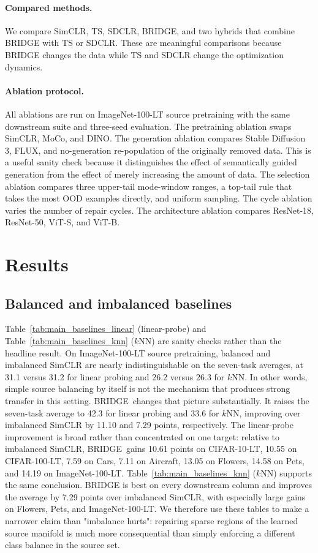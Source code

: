 \documentclass{article}
\newcommand{\method}{BRIDGE}
\begin{document}
\paragraph{Compared methods.}
We compare SimCLR, TS, SDCLR, \method, and two hybrids that combine BRIDGE with TS or SDCLR. These are meaningful comparisons because BRIDGE changes the data while TS and SDCLR change the optimization dynamics.

\paragraph{Ablation protocol.}
All ablations are run on ImageNet-100-LT source pretraining with the same downstream suite and three-seed evaluation. The pretraining ablation swaps SimCLR, MoCo, and DINO. The generation ablation compares Stable Diffusion 3, FLUX, and no-generation re-population of the originally removed data. This is a useful sanity check because it distinguishes the effect of semantically guided generation from the effect of merely increasing the amount of data. The selection ablation compares three upper-tail mode-window ranges, a top-tail rule that takes the most OOD examples directly, and uniform sampling. The cycle ablation varies the number of repair cycles. The architecture ablation compares ResNet-18, ResNet-50, ViT-S, and ViT-B.

\section{Results}
\subsection{Balanced and imbalanced baselines}
Table~\ref{tab:main_baselines_linear} (linear-probe) and Table~\ref{tab:main_baselines_knn} ($k$NN) are sanity checks rather than the headline result. On ImageNet-100-LT source pretraining, balanced and imbalanced SimCLR are nearly indistinguishable on the seven-task averages, at 31.1 versus 31.2 for linear probing and 26.2 versus 26.3 for $k$NN. In other words, simple source balancing by itself is not the mechanism that produces strong transfer in this setting. \method\ changes that picture substantially. It raises the seven-task average to 42.3 for linear probing and 33.6 for $k$NN, improving over imbalanced SimCLR by 11.10 and 7.29 points, respectively. The linear-probe improvement is broad rather than concentrated on one target: relative to imbalanced SimCLR, \method\ gains 10.61 points on CIFAR-10-LT, 10.55 on CIFAR-100-LT, 7.59 on Cars, 7.11 on Aircraft, 13.05 on Flowers, 14.58 on Pets, and 14.19 on ImageNet-100-LT. Table~\ref{tab:main_baselines_knn} ($k$NN) supports the same conclusion. BRIDGE is best on every downstream column and improves the average by 7.29 points over imbalanced SimCLR, with especially large gains on Flowers, Pets, and ImageNet-100-LT. We therefore use these tables to make a narrower claim than "imbalance hurts": repairing sparse regions of the learned source manifold is much more consequential than simply enforcing a different class balance in the source set.
\end{document}
